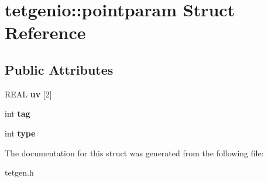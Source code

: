 \hypertarget{structtetgenio_1_1pointparam}{}\section{tetgenio\+:\+:pointparam Struct Reference}
\label{structtetgenio_1_1pointparam}
\subsection*{Public Attributes}
\begin{DoxyCompactItemize}
\item 
\mbox{\label{structtetgenio_1_1pointparam_a043a61660f4b9f0e164c91692fdb0ee5}} 
R\+E\+AL {\bfseries uv} \mbox{[}2\mbox{]}
\item 
\mbox{\label{structtetgenio_1_1pointparam_aa7ad61c79f963c3d198d5f48f5501f52}} 
int {\bfseries tag}
\item 
\mbox{\label{structtetgenio_1_1pointparam_a172c5af02af4fe6ab385df812c1ea1ff}} 
int {\bfseries type}
\end{DoxyCompactItemize}


The documentation for this struct was generated from the following file\+:\begin{DoxyCompactItemize}
\item 
tetgen.\+h\end{DoxyCompactItemize}
